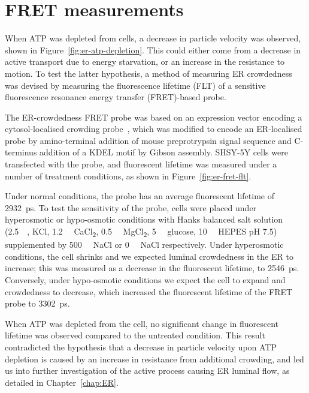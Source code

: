 \section{FRET measurements} \label{appn:fret}
When ATP was depleted from cells, a decrease in particle velocity was observed, shown in Figure~\ref{fig:er-atp-depletion}. 
This could either come from a decrease in active transport due to energy starvation, or an increase in the resistance to motion. 
To test the latter hypothesis, a method of measuring ER crowdedness was devised by measuring the fluorescence lifetime (FLT) of a sensitive fluorescence resonance energy transfer (FRET)-based probe. 

The ER-crowdedness FRET probe was based on an expression vector encoding a cytosol-localised crowding probe~\cite{boersma2015sensor}, which was modified to encode an ER-localised probe by amino-terminal addition of mouse preprotrypsin signal sequence and C-terminus addition of a KDEL motif by Gibson assembly. 
SHSY-5Y cells were transfected with the probe, and fluorescent lifetime was measured under a number of treatment conditions, as shown in Figure~\ref{fig:er-fret-flt}.

Under normal conditions, the probe has an average fluorescent lifetime of \SI{2932}{\pico\second}. 
To test the sensitivity of the probe, cells were placed under hyperosmotic or hypo-osmotic conditions with Hanks balanced salt solution (\SI{2.5}{\milli\Molar}, KCl, \SI{1.2}{\milli\Molar} CaCl\textsubscript{2}, \SI{0.5}{\milli\Molar} MgCl\textsubscript{2}, \SI{5}{\milli\Molar} glucose, \SI{10}{\milli\Molar} HEPES pH 7.5) supplemented by \SI{500}{\milli\Molar} NaCl or \SI{0}{\milli\Molar} NaCl respectively. 
Under hyperosmotic conditions, the cell shrinks and we expected luminal crowdedness in the ER to increase; this was measured as a decrease in the fluorescent lifetime, 
to \SI{2546}{\pico\second}. 
Conversely, under hypo-osmotic conditions we expect the cell to expand and crowdedness to decrease, which increased the fluorescent lifetime of the FRET probe to \SI{3302}{\pico\second}. 

When ATP was depleted from the cell, no significant change in fluorescent lifetime was observed compared to the untreated condition. 
This result contradicted the hypothesis that a decrease in particle velocity upon ATP depletion is caused by an increase in resistance from additional crowding, and led us into further investigation of the active process causing ER luminal flow, as detailed in Chapter~\ref{chap:ER}. 

